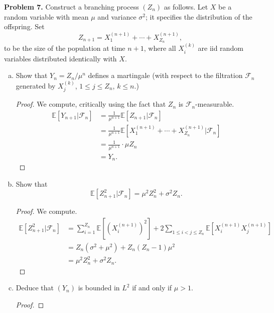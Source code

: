 \documentclass[11pt,letterpaper]{report}
\newcommand{\mcal}[1]{\mathcal{#1}}
\newcommand{\E}{\mathbb{E}}
\begin{document}
\noindent\textbf{Problem 7. }
Construct a branching process $(Z_n)$ as follows. Let $X$ be a random variable with mean $\mu$ and variance $\sigma^2$; it specifies the distribution of the offspring. Set
\[
Z_{n+1} = X_1^{(n+1)} + \cdots + X_{Z_n}^{(n+1)},
\]
to be the size of the population at time $n+1$, where all $X_i^{(k)}$ are iid random variables distributed identically with $X$.
\begin{enumerate}[(a)]
	\item Show that $Y_n = Z_n/\mu^n$ defines a martingale (with respect to the filtration $\mcal{F}_n$ generated by $X_j^{(k)}$, $1\leq j\leq Z_n$, $k\leq n$.)
	\begin{proof}
		We compute, critically using the fact that $Z_n$ is $\mcal{F}_n$-measurable.
		\begin{align*}
			\E[Y_{n+1}|\mcal{F}_n] &= \frac{1}{\mu^{n+1}}\E[Z_{n+1}|\mcal{F}_n]\\
			&= \frac{1}{\mu^{n+1}}\E[X_1^{(n+1)} + \cdots + X_{Z_n}^{(n+1)}|\mcal{F}_n]\\
			&= \frac{1}{\mu^{n+1}}\cdot \mu Z_n\\
			&= Y_n.
		\end{align*}
	\end{proof}

	\item Show that
	\[
	\E[Z_{n+1}^2|\mcal{F}_n] = \mu^2Z_n^2 + \sigma^2Z_n.
	\]
	\begin{proof}
		We compute.
		\begin{align*}
			\E[Z_{n+1}^2|\mcal{F}_n] &= \sum_{i=1}^{Z_n}\E[(X^{(n+1)}_i)^2] + 2\sum_{1\leq i<j\leq Z_n}\E[X_i^{(n+1)}X_j^{(n+1)}]\\
			&= Z_n(\sigma^2+\mu^2) + Z_n(Z_n-1)\mu^2\\
			&= \mu^2Z_n^2 + \sigma^2Z_n.
		\end{align*}
	\end{proof}

	\item Deduce that $(Y_n)$ is bounded in $L^2$ if and only if $\mu>1$.
	\begin{proof}
		
	\end{proof}
\end{enumerate}
\end{document}
